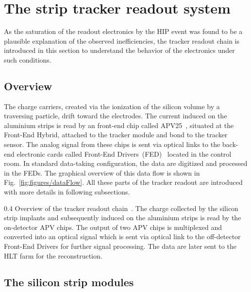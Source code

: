 \newpage

\section{The strip tracker readout system}

As the saturation of the readout electronics by the HIP event was found to be a plausible explanation of the observed inefficiencies, the tracker readout chain is introduced in this section to understand the behavior of the electronics under such conditions.


\subsection{Overview}


The charge carriers, created via the ionization of the silicon volume by a traversing particle, drift toward the electrodes. The current induced on the aluminium strips is read by an front-end chip called APV25~\cite{French:2001xb}, situated at the Front-End Hybrid, attached to the tracker module and bond to the tracker sensor. The analog signal from these chips is sent via optical links to the back-end electronic cards called Front-End Drivers~(FED)~\cite{Baird:2002wg} located in the control room. In standard data-taking configuration, the data are digitized and processed in the FEDs. The graphical overview of this data flow is shown in Fig.~\ref{fig:figures/dataFlow}. All these parts of the tracker readout are introduced with more details in following subsections.

                 {0.4}       %
                 {Overview of the tracker readout chain~\cite{Bainbridge:2004jc}. The charge collected by the silicon strip implants and subsequently induced on the aluminium strips is read by the on-detector APV chips. The output of two APV chips is multiplexed and converted into an optical signal which is sent via optical link to the off-detector Front-End Drivers for further signal processing. The data are later sent to the HLT farm for the reconstruction. } %

\subsection{The silicon strip modules}

